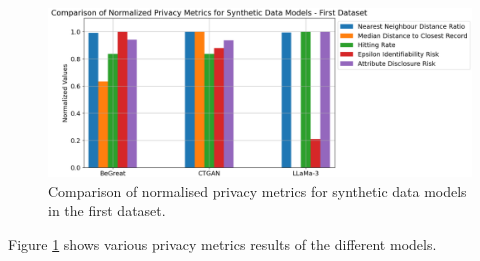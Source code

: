 \begin{figure}[H]
    \centering
        \centering
        \includegraphics[width=1\textwidth]{images/dataset1_privacy.png}
        \caption{Comparison of normalised privacy metrics for synthetic data models in the first dataset.}
        \label{fig:dataset1_privacy}
\end{figure}

Figure \ref{fig:dataset1_privacy} shows various privacy metrics results of the different models.


